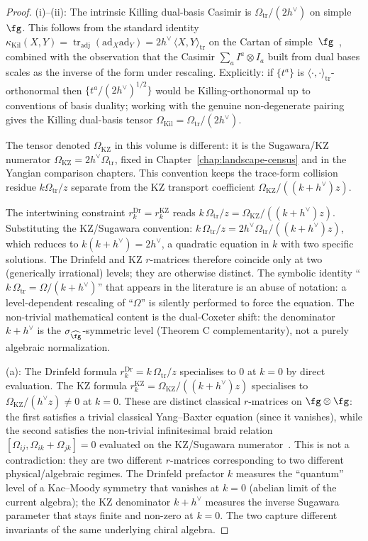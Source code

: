 \begin{proof}
(i)--(ii): The intrinsic Killing dual-basis Casimir is
$\Omega_{\mathrm{tr}}/(2h^\vee)$ on simple~$\fg$. This follows from
the standard identity
$\kappa_{\mathrm{Kil}}(X,Y) = \operatorname{tr}_{\mathrm{adj}}(\mathrm{ad}_X \mathrm{ad}_Y)
= 2h^\vee\,\langle X,Y\rangle_{\mathrm{tr}}$ on the Cartan of
simple~$\fg$~\cite[\S 1.1]{EK96}, combined with the observation that
the Casimir $\sum_a I^a \otimes I_a$ built from dual bases scales as
the inverse of the form under rescaling. Explicitly: if
$\{t^a\}$ is $\langle\cdot,\cdot\rangle_{\mathrm{tr}}$-orthonormal
then $\{t^a/(2h^\vee)^{1/2}\}$ would be Killing-orthonormal up to
conventions of basis duality; working with the genuine non-degenerate
pairing gives the Killing dual-basis tensor
$\Omega_{\mathrm{Kil}} = \Omega_{\mathrm{tr}}/(2h^\vee)$.

The tensor denoted $\Omega_{\mathrm{KZ}}$ in this volume is different:
it is the Sugawara/KZ numerator
$\Omega_{\mathrm{KZ}}=2h^\vee\Omega_{\mathrm{tr}}$, fixed in
Chapter~\ref{chap:landscape-census} and in the Yangian comparison
chapters. This convention keeps the trace-form collision residue
$k\Omega_{\mathrm{tr}}/z$ separate from the KZ transport coefficient
$\Omega_{\mathrm{KZ}}/((k+h^\vee)z)$.

The intertwining constraint $r^{\mathrm{Dr}}_k = r^{\mathrm{KZ}}_k$
reads $k\,\Omega_{\mathrm{tr}}/z = \Omega_{\mathrm{KZ}}/((k+h^\vee)z)$.
Substituting the KZ/Sugawara convention:
$k\,\Omega_{\mathrm{tr}}/z = 2h^\vee\Omega_{\mathrm{tr}}/((k+h^\vee)z)$,
which reduces to $k(k+h^\vee) = 2h^\vee$, a quadratic equation in
$k$ with two specific solutions. The Drinfeld and KZ $r$-matrices
therefore coincide only at two (generically irrational) levels; they
are otherwise distinct. The symbolic identity
``$k\,\Omega_{\mathrm{tr}} = \Omega/(k+h^\vee)$'' that appears in the
literature is an abuse of notation: a level-dependent rescaling of
``$\Omega$'' is silently performed to force the equation. The
non-trivial mathematical content is the dual-Coxeter shift: the
denominator $k+h^\vee$ is the $\sigma_{\widehat{\fg}}$-symmetric level
(Theorem C complementarity), not a purely algebraic normalization.

(a): The Drinfeld formula $r^{\mathrm{Dr}}_k = k\,\Omega_{\mathrm{tr}}/z$
specialises to $0$ at $k=0$ by direct evaluation. The KZ formula
$r^{\mathrm{KZ}}_k = \Omega_{\mathrm{KZ}}/((k+h^\vee)z)$ specialises
to $\Omega_{\mathrm{KZ}}/(h^\vee z) \neq 0$ at $k=0$. These are
distinct classical $r$-matrices on $\fg \otimes \fg$: the first
satisfies a trivial classical Yang--Baxter equation (since it
vanishes), while the second satisfies the non-trivial infinitesimal
braid relation $[\Omega_{ij}, \Omega_{ik} + \Omega_{jk}] = 0$
evaluated on the KZ/Sugawara numerator~\cite{Bernard88}. This is not
a contradiction: they are two different $r$-matrices corresponding to
two different physical/algebraic regimes. The Drinfeld prefactor
$k$ measures the ``quantum'' level of a Kac--Moody symmetry that
vanishes at $k=0$ (abelian limit of the current algebra); the KZ
denominator $k+h^\vee$ measures the inverse Sugawara parameter that
stays finite and non-zero at $k=0$. The two capture different
invariants of the same underlying chiral algebra.


\end{proof}
